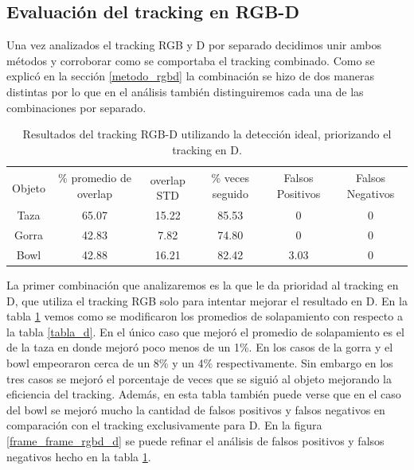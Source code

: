 \subsection{Evaluación del tracking en RGB-D}
Una vez analizados el tracking RGB y D por separado decidimos unir ambos métodos y corroborar como se comportaba el tracking combinado. Como se explicó en la sección \ref{metodo_rgbd} la combinación se hizo de dos maneras distintas por lo que en el análisis también distinguiremos cada una de las combinaciones por separado.

\begin{table}
    \begin{tabular}{|c|c|c|c|c|c|}
    \hline
    & \multirow{2}{2.4cm}{\% promedio de overlap} & & \multirow{2}{2cm}{\% veces seguido} & \multirow{2}{1.6cm}{Falsos Positivos} & \multirow{2}{1.6cm}{Falsos Negativos}\\
	Objeto & & overlap STD & & &\\
    \hline
    Taza   & 65.07      & 15.22       & 85.53             & 0                & 0\\
    \hline
    Gorra  & 42.83      &  7.82       & 74.80             & 0                & 0\\
    \hline
    Bowl   & 42.88      & 16.21       & 82.42             & 3.03             & 0\\
    \hline
    \end{tabular}
\caption{Resultados del tracking RGB-D utilizando la detección ideal, priorizando el tracking en D.}
\label{tabla_rgbd_d}
\end{table}

La primer combinación que analizaremos es la que le da prioridad al tracking en D, que utiliza el tracking RGB solo para intentar mejorar el resultado en D. En la tabla \ref{tabla_rgbd_d} vemos como se modificaron los promedios de solapamiento con respecto a la tabla \ref{tabla_d}. En el único caso que mejoró el promedio de solapamiento es el de la taza en donde mejoró poco menos de un 1\%. En los casos de la gorra y el bowl empeoraron cerca de un 8\% y un 4\% respectivamente. Sin embargo en los tres casos se mejoró el porcentaje de veces que se siguió al objeto mejorando la eficiencia del tracking. Además, en esta tabla también puede verse que en el caso del bowl se mejoró mucho la cantidad de falsos positivos y falsos negativos en comparación con el tracking exclusivamente para D. En la figura \ref{frame_frame_rgbd_d} se puede refinar el análisis de falsos positivos y falsos negativos hecho en la tabla \ref{tabla_rgbd_d}.

